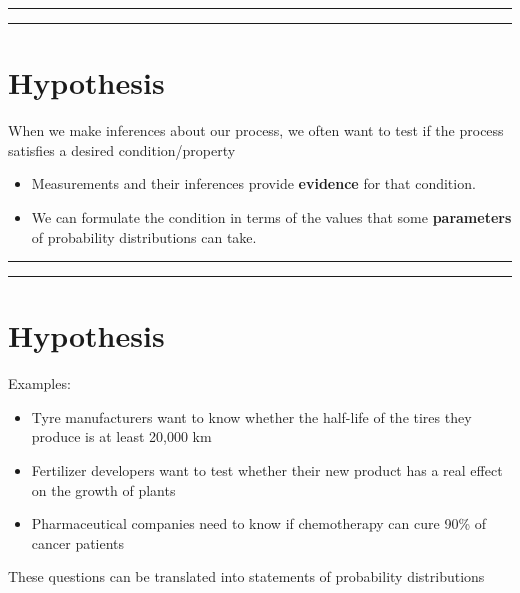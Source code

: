 \documentclass[
]{book}
\providecommand{\tightlist}{%
  \setlength{\itemsep}{0pt}\setlength{\parskip}{0pt}}
\begin{document}
\begin{center}\rule{0.5\linewidth}{0.5pt}\end{center}

\begin{center}\rule{0.5\linewidth}{0.5pt}\end{center}

\hypertarget{hypothesis}{%
\section{Hypothesis}\label{hypothesis}}

When we make inferences about our process, we often want to test if the process satisfies a desired condition/property

\begin{itemize}
\item
  Measurements and their inferences provide \textbf{evidence} for that condition.
\item
  We can formulate the condition in terms of the values that some \textbf{parameters} of probability distributions can take.
\end{itemize}

\begin{center}\rule{0.5\linewidth}{0.5pt}\end{center}

\begin{center}\rule{0.5\linewidth}{0.5pt}\end{center}

\hypertarget{hypothesis-1}{%
\section{Hypothesis}\label{hypothesis-1}}

Examples:

\begin{itemize}
\tightlist
\item
  Tyre manufacturers want to know whether the half-life of the tires they produce is at least 20,000 km
\item
  Fertilizer developers want to test whether their new product has a real effect on the growth of plants
\item
  Pharmaceutical companies need to know if chemotherapy can cure 90\% of cancer patients
\end{itemize}

These questions can be translated into statements of probability distributions
\end{document}
